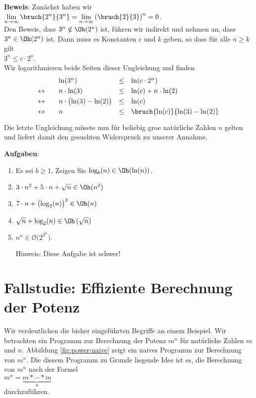 \noindent
\textbf{Beweis}:  Zun\"achst haben wir \\[0.1cm]
\hspace*{1.3cm} 
$\displaystyle\lim\limits_{n \rightarrow \infty} \bruch{2^n}{3^n} = 
 \lim\limits_{n \rightarrow \infty} \left(\bruch{2}{3}\right)^n = 0$.
\\[0.1cm]
Den Beweis, dass $3^n \notin \Oh(2^n)$ ist, f\"uhren wir indirekt und nehmen an, dass 
$3^n \in \Oh(2^n)$ ist.  Dann muss es Konstanten $c$ und $k$ geben, so dass f\"ur alle $n
\geq k$ gilt \\[0.1cm]
\hspace*{1.3cm} $3^n \leq c \cdot 2^n$. \\[0.1cm]
Wir logarithmieren beide Seiten dieser Ungleichung und finden \\[0.1cm]
\[
\begin{array}{llcl}
                & \ln(3^n) & \leq & \ln(c \cdot 2^n) \\[0.1cm]
\leftrightarrow\quad &  n \cdot \ln(3) & \leq & \ln(c) + n \cdot \ln(2) \\[0.1cm]
\leftrightarrow &  n \cdot \bigl(\ln(3) - \ln(2)\bigr) & \leq & \ln(c)  \\[0.1cm]
\leftrightarrow &  n  & \leq & \bruch{\ln(c)}{\ln(3) - \ln(2)}  \\[0.1cm]
\end{array}
\]
Die letzte Ungleichung m\"usste nun f\"ur beliebig gro\3e nat\"urliche Zahlen $n$ gelten und liefert
damit den gesuchten Widerspruch zu unserer Annahme.
\vspace*{0.3cm}

\noindent
\textbf{Aufgaben}:  
\begin{enumerate}
\item Es sei $b \geq 1$. Zeigen Sie $\log_{b}(n) \in \Oh(\ln(n))$.
\item $3 \cdot n^2 + 5 \cdot n + \sqrt{n} \in \Oh(n^2)$
\item $7 \cdot n + \bigl(\log_2(n)\bigr)^2 \in \Oh(n)$
\item $\sqrt{n} + \log_2(n) \in \Oh\left(\sqrt{n}\right)$
\item $n^n \in \mathcal{O}\bigl(2^{2^n}\bigr)$.

      Hinweis:  Diese Aufgabe ist schwer!
\end{enumerate}


\section{Fallstudie: Effiziente Berechnung der Potenz}
Wir  verdeutlichen die bisher eingef\"uhrten Begriffe an einem Beispiel.  Wir betrachten ein
Programm zur Berechnung der Potenz $m^n$ f\"ur nat\"urliche Zahlen $m$ und $n$.
Abbildung \ref{fig:power-naive} zeigt ein naives Programm zur Berechnung von $m^n$.
Die diesem Programm zu Grunde liegende Idee ist es, die Berechnung von $m^n$ 
nach der Formel \\[0.1cm]
\hspace*{1.3cm} 
$m^n = \underbrace{m * \cdots * m}_n$ \\[0.1cm]
durchzuf\"uhren.  

